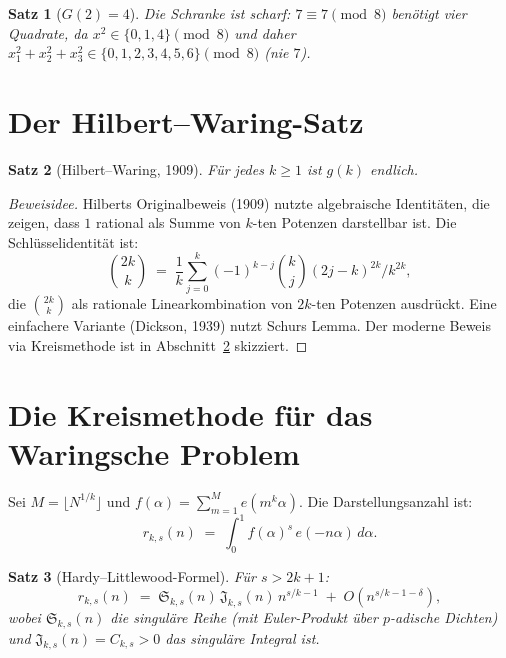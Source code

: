 \documentclass[12pt,a4paper]{amsart}
\newtheorem{theorem}{Satz}[section]
\theoremstyle{definition}
\newcommand{\eq}[1]{e\!\left(#1\right)}
\begin{document}
\begin{theorem}[$G(2) = 4$]\label{thm:g2}
  Die Schranke ist scharf: $7 \equiv 7 \pmod 8$ benötigt vier Quadrate,
  da $x^2 \in \{0, 1, 4\} \pmod 8$ und daher
  $x_1^2 + x_2^2 + x_3^2 \in \{0,1,2,3,4,5,6\} \pmod 8$ (nie $7$).
\end{theorem}

\section{Der Hilbert--Waring-Satz}
\label{sec:hilbert}

\begin{theorem}[Hilbert--Waring, 1909]\label{thm:hw}
  Für jedes $k \geq 1$ ist $g(k)$ endlich.
\end{theorem}

\begin{proof}[Beweisidee]
  Hilberts Originalbeweis (1909) nutzte algebraische Identitäten, die zeigen,
  dass $1$ rational als Summe von $k$-ten Potenzen darstellbar ist.  Die
  Schlüsselidentität ist:
  \[
    \binom{2k}{k} \;=\; \frac{1}{k} \sum_{j=0}^{k} (-1)^{k-j} \binom{k}{j} (2j-k)^{2k} / k^{2k},
  \]
  die $\binom{2k}{k}$ als rationale Linearkombination von $2k$-ten Potenzen ausdrückt.
  Eine einfachere Variante (Dickson, 1939) nutzt Schurs Lemma.
  Der moderne Beweis via Kreismethode ist in Abschnitt~\ref{sec:kreismethode} skizziert.
\end{proof}

\section{Die Kreismethode für das Waringsche Problem}
\label{sec:kreismethode}

Sei $M = \lfloor N^{1/k} \rfloor$ und $f(\alpha) = \sum_{m=1}^{M} \eq{m^k \alpha}$.
Die Darstellungsanzahl ist:
\[
  r_{k,s}(n) \;=\; \int_0^1 f(\alpha)^s\, \eq{-n\alpha}\, d\alpha.
\]

\begin{theorem}[Hardy--Littlewood-Formel]\label{thm:HL}
  Für $s > 2k+1$:
  \[
    r_{k,s}(n) \;=\; \mathfrak{S}_{k,s}(n)\, \mathfrak{J}_{k,s}(n)\, n^{s/k-1}
                     \;+\; O\!\left(n^{s/k-1-\delta}\right),
  \]
  wobei $\mathfrak{S}_{k,s}(n)$ die singuläre Reihe (mit Euler-Produkt über
  $p$-adische Dichten) und $\mathfrak{J}_{k,s}(n) = C_{k,s} > 0$ das
  singuläre Integral ist.
\end{theorem}
\end{document}
